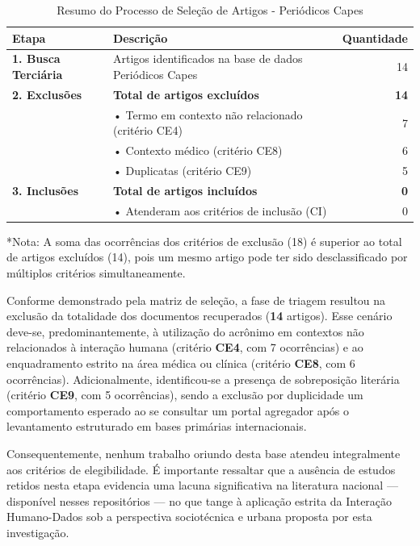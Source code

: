 \documentclass[
	12pt,				%
	oneside,			%
	a4paper,			%
	english,			%
	brazil				%
	]{abntex2ppgsi}
\begin{document}
\begin{table}[H]
\centering
\caption{Resumo do Processo de Seleção de Artigos - Periódicos Capes}
\label{tab:resumo_selecao_PeriCapes}
\begin{tabularx}{\textwidth}{lXr}
\toprule
\textbf{Etapa} & \textbf{Descrição} & \textbf{Quantidade} \\
\midrule
\textbf{1. Busca Terciária} & Artigos identificados na base de dados Periódicos Capes & 14 \\
\midrule
\textbf{2. Exclusões} & \textbf{Total de artigos excluídos} & \textbf{14} \\
& \hspace{0.5cm}• Termo em contexto não relacionado (critério CE4) & 7 \\
& \hspace{0.5cm}• Contexto médico (critério CE8) & 6 \\
& \hspace{0.5cm}• Duplicatas (critério CE9) & 5 \\
\midrule
\textbf{3. Inclusões} & \textbf{Total de artigos incluídos} & \textbf{0} \\
& \hspace{0.5cm}• Atenderam aos critérios de inclusão (CI) & 0 \\
\bottomrule
\end{tabularx}
\vspace{0.2cm}
\footnotesize{*Nota: A soma das ocorrências dos critérios de exclusão (18) é superior ao total de artigos excluídos (14), pois um mesmo artigo pode ter sido desclassificado por múltiplos critérios simultaneamente.}
\end{table}

    Conforme demonstrado pela matriz de seleção, a fase de triagem resultou na exclusão da totalidade dos documentos recuperados (\textbf{14} artigos). Esse cenário deve-se, predominantemente, à utilização do acrônimo em contextos não relacionados à interação humana (critério \textbf{CE4}, com 7 ocorrências) e ao enquadramento estrito na área médica ou clínica (critério \textbf{CE8}, com 6 ocorrências). Adicionalmente, identificou-se a presença de sobreposição literária (critério \textbf{CE9}, com 5 ocorrências), sendo a exclusão por duplicidade um comportamento esperado ao se consultar um portal agregador após o levantamento estruturado em bases primárias internacionais. 

    Consequentemente, nenhum trabalho oriundo desta base atendeu integralmente aos critérios de elegibilidade. É importante ressaltar que a ausência de estudos retidos nesta etapa evidencia uma lacuna significativa na literatura nacional --- disponível nesses repositórios --- no que tange à aplicação estrita da Interação Humano-Dados sob a perspectiva sociotécnica e urbana proposta por esta investigação.
    
\end{document}
